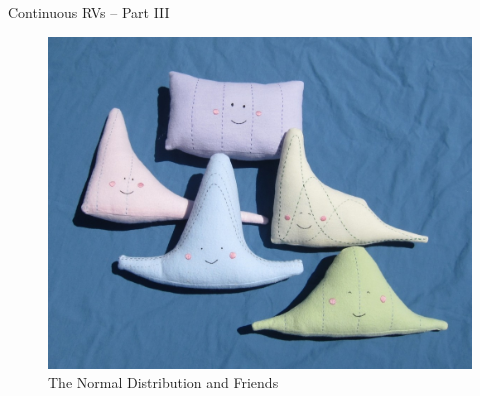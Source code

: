 \documentclass[handout]{beamer}
\date{Lecture \# 13}
\begin{document}
 


\begin{frame}[plain]
	\titlepage 
	

\end{frame} 

\begin{frame}
\Huge \begin{center}
Continuous RVs -- Part III
\end{center}
\end{frame}
\begin{frame}
\begin{figure}
\includegraphics[scale = 0.2]{./images/normal_friends}
\caption{The Normal Distribution and Friends}
\end{figure}
\end{frame}
\end{document}
